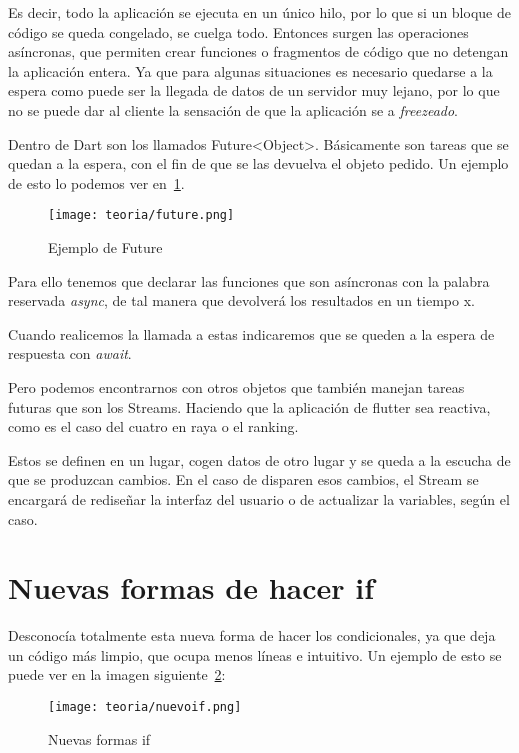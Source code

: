Es decir, todo la aplicación se ejecuta en un único hilo, por lo que si un bloque de código se queda congelado, se cuelga todo. Entonces surgen las operaciones asíncronas, que permiten crear funciones o fragmentos de código que no detengan la aplicación entera. Ya que para algunas situaciones es necesario quedarse a la espera como puede ser la llegada de datos de un servidor muy lejano, por lo que no se puede dar al cliente la sensación de que la aplicación se a \emph{freezeado}.

Dentro de Dart son los llamados Future<Object>. Básicamente son tareas que se quedan a la espera, con el fin de que se las devuelva el objeto pedido. Un ejemplo de esto lo podemos ver en~\ref{fig:future}.

\begin{figure}[H]
	\centering
	\texttt{[image: teoria/future.png]}
	\caption{Ejemplo de Future}\label{fig:future}
\end{figure}

Para ello tenemos que declarar las funciones que son asíncronas con la palabra reservada \emph{async}, de tal manera que devolverá los resultados en un tiempo x.

Cuando realicemos la llamada a estas indicaremos que se queden a la espera de respuesta con \emph{await}.

Pero podemos encontrarnos con otros objetos que también manejan tareas futuras que son los Streams. Haciendo que la aplicación de flutter sea reactiva, como es el caso del cuatro en raya o el ranking.

Estos se definen en un lugar, cogen datos de otro lugar y se queda a la escucha de que se produzcan cambios. En el caso de disparen esos cambios, el Stream se encargará de rediseñar la interfaz del usuario o de actualizar la variables, según el caso.

\section{Nuevas formas de hacer if}
Desconocía totalmente esta nueva forma de hacer los condicionales, ya que deja un código más limpio, que ocupa menos líneas e intuitivo. Un ejemplo de esto se puede ver en la imagen siguiente~\ref{fig:nuevoif}:

\begin{figure}[H]
	\centering
	\texttt{[image: teoria/nuevoif.png]}
	\caption{Nuevas formas if}\label{fig:nuevoif}
\end{figure}

